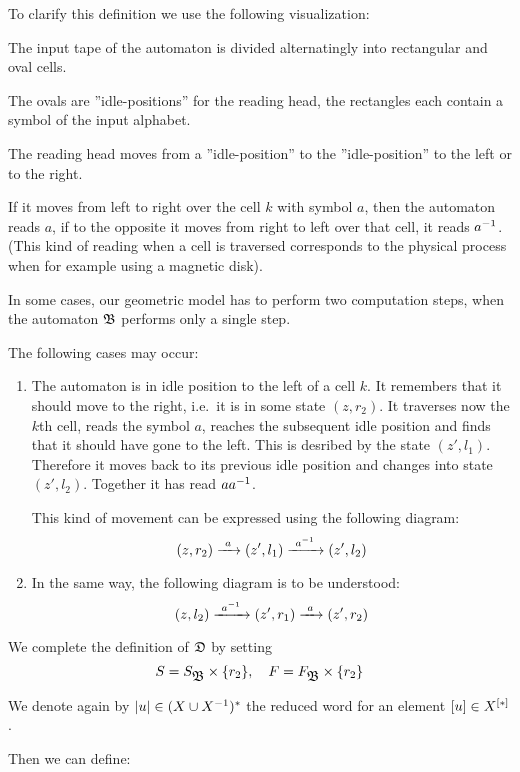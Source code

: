 \bigskip
To clarify this definition we use the following visualization:

The input tape of the automaton is divided alternatingly into rectangular and
oval cells.

\missingfigure

The ovals are ''idle-positions'' for the reading head, the rectangles
each contain a symbol of the input alphabet.

The reading head moves from a ''idle-position'' to the ''idle-position'' to the
left or to the right.

If it moves from left to right over the cell $k$ with symbol $a$, then the
automaton reads $a$, if to the opposite it moves from right to left over that
cell, it reads ${{a}^{-1}}$. (This kind of reading when a cell is traversed
corresponds to the physical process when for example using a magnetic disk).

In some cases, our geometric model has to perform two computation steps, when
the automaton $\mbox{$\mathfrak{B}$}$ performs only a single step.

The following cases may occur:

\begin{enumerate}
  \item The automaton is in idle position to the left of a cell $k$. It
  remembers that it should move to the right, i.e.\ it is in some state $(z,
  r_2)$. It traverses now the $k$th cell, reads the symbol $a$, reaches the
  subsequent idle position and finds that it should have gone to the left. This
  is desribed by the state $(z', l_1)$. Therefore it moves back to its previous
  idle position and changes into state $(z', l_2)$. Together it has read $a
  {{a}^{-1}}$.
  
  This kind of movement can be expressed using the following diagram:
  \[ (z, r_2) \xrightarrow{\ {a}\ } (z', l_1) \xrightarrow{\ {{{a}^{-1}}}\ } (z', l_2) \]
  
  \item In the same way, the following diagram is to be understood:
  \[ (z, l_2) \xrightarrow{\ {{{a}^{-1}}}\ } (z', r_1) \xrightarrow{\ {a}\ } (z', r_2) \]
\end{enumerate}

We complete the definition of $\mbox{$\mathfrak{D}$}$ by setting
\[ S = S_{\mbox{$\mathfrak{B}$}} \times \mbox{$\{r_2\}$},\quad F = F_{\mbox{$\mathfrak{B}$}} \times \mbox{$\{r_2\}$} \]

We denote again by $|u| \in (X \cup {X}^{-1})^*$ the reduced word for an element
$[u] \in \mbox{${X}^{[*]}$}$.

Then we can define:

